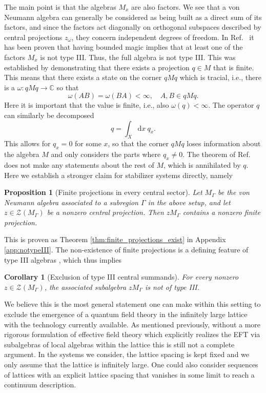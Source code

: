 \documentclass[aps,pra,reprint,superscriptaddress]{revtex4-2}
\newcommand{\bbC}{\mathbb C}
\newcommand{\cZ}{{\mathcal Z}}
\newcommand\G{\Gamma}
\newcommand\w{\omega}
\newtheorem{proposition}[theorem]{Proposition}
\newtheorem{corollary}[theorem]{Corollary}
\theoremstyle{definition}
\theoremstyle{remark}
\begin{document}
The main point is that the algebras $M_x$ are also factors. We see that a von Neumann algebra can generally be considered as being built as a direct sum of its factors,
and since the factors act diagonally on orthogonal subspaces described by central projections $z_\w$, they concern independent degrees of freedom.
In Ref.~\cite{Moosa:2026nqz} it has been proven that having bounded magic
implies that at least one of the factors $M_x$ is not type III. Thus, the full algebra is not type III. This was established by demonstrating that there exists a projection $q\in M$ that is finite. This means that there exists a state on the corner $q M q$ which is tracial, i.e., there is a $\w : qMq \to \bbC$ so that 
\begin{equation}
\w(AB) = \w(BA) < \infty,\quad A,B \in qMq.
\end{equation}
Here it is important that the value is finite, i.e., also $\w(q)< \infty$. 
The operator $q$ can similarly be decomposed 
\begin{equation}
    q = \int_X \mathrm{d}x\ q_x.
\end{equation}
This allows for $q_x = 0$ for some $x$, so that the corner $q M q$ loses information about the algebra $M$ and only considers the parts where $q_x \neq 0$. The theorem of Ref.~\cite{Moosa:2026nqz} does not make any statements about the rest of $M$, which is annihilated by $q$. Here we establish a stronger claim for stabilizer systems directly, namely
\begin{proposition}[Finite projections in every central sector]
    Let $M_\G$ be the von Neumann algebra associated to a subregion $\G$ in the above setup, and let $z \in \cZ(M_\G)$ be a nonzero central projection. Then $zM_\G$ contains a nonzero finite projection.
\end{proposition}
This is proven as Theorem \ref{thm:finite_projections_exist} in Appendix \ref{app:notypeIII}.
The non-existence of finite projections is a defining feature of type III algebras \cite[III.1.4.2]{Blackadar}, which thus implies
\begin{corollary}[Exclusion of type III central summands]\label{thm:no_type_III}
    For every nonzero $z \in \cZ(M_\G)$, the associated subalgebra $zM_\G$ is not of type III.
\end{corollary}
We believe this is the most general statement one can make within this setting to exclude the emergence of a quantum
field theory in the infinitely large lattice with the technology currently available. As mentioned previously, 
without a more rigorous formulation of effective field theory which explicitly realizes the EFT via subalgebras of local algebras within the lattice
this is still not a complete argument. In the systems we consider, the lattice spacing is kept fixed and we only assume that the lattice is infinitely large. One could also consider sequences of lattices with an explicit lattice spacing that vanishes in some limit to reach a continuum description.
\end{document}
